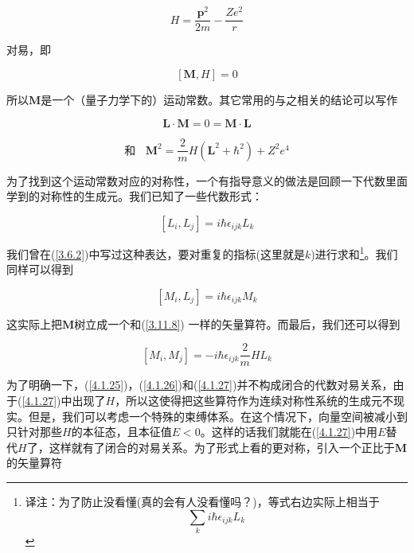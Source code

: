 \documentclass[UTF8,twoside]{ctexart}
\begin{document}
\begin{equation}
H = \frac{\bm{p}^2}{2m} - \frac{Ze^2}{r}
\end{equation}

\noindent 对易，即

\begin{equation}
\left[\bm{M}, H\right] = 0
\end{equation}

\noindent 所以$\bm M$是一个（量子力学下的）运动常数。其它常用的与之相关的结论可以写作

\begin{equation}  \label{4.1.23}
\bm{L \cdot M} = 0 = \bm{M \cdot L}
\end{equation}

\begin{equation}  \label{4.1.24}
\text{和}\ \ \ \ \bm{M}^2 = \frac{2}{m}H\left(\bm{L}^2 + \hbar^2\right) + Z^2e^4
\end{equation}

为了找到这个运动常数对应的对称性，一个有指导意义的做法是回顾一下代数里面学到的对称性的生成元。我们已知了一些代数形式：

\begin{equation}  \label{4.1.25}
\left[L_i, L_j\right] = i\hbar \epsilon_{ijk}L_k
\end{equation}

\noindent 我们曾在(\ref{3.6.2})中写过这种表达，要对重复的指标(这里就是$k$)进行求和\footnote[5]{译注：为了防止没看懂(真的会有人没看懂吗？)，等式右边实际上相当于\\ \[\sum_k i\hbar \epsilon_{ijk}L_k\]}。我们同样可以得到

\begin{equation}  \label{4.1.26}
\left[M_i, L_j\right] = i\hbar \epsilon_{ijk}M_k
\end{equation}

\noindent 这实际上把$\bm M$树立成一个和(\ref{3.11.8}) 一样的矢量算符。而最后，我们还可以得到

\begin{equation}  \label{4.1.27}
\left[M_i, M_j\right] = -i\hbar \epsilon_{ijk}\frac{2}{m}HL_k
\end{equation}

为了明确一下，(\ref{4.1.25})，(\ref{4.1.26})和(\ref{4.1.27})并不构成闭合的代数对易关系，由于(\ref{4.1.27})中出现了$H$，所以这使得把这些算符作为连续对称性系统的生成元不现实。但是，我们可以考虑一个特殊的束缚体系。在这个情况下，向量空间被减小到只针对那些$H$的本征态，且本征值$E < 0$。这样的话我们就能在(\ref{4.1.27})中用$E$替代$H$了，这样就有了闭合的对易关系。为了形式上看的更对称，引入一个正比于$\bm M$ 的矢量算符
\end{document}
